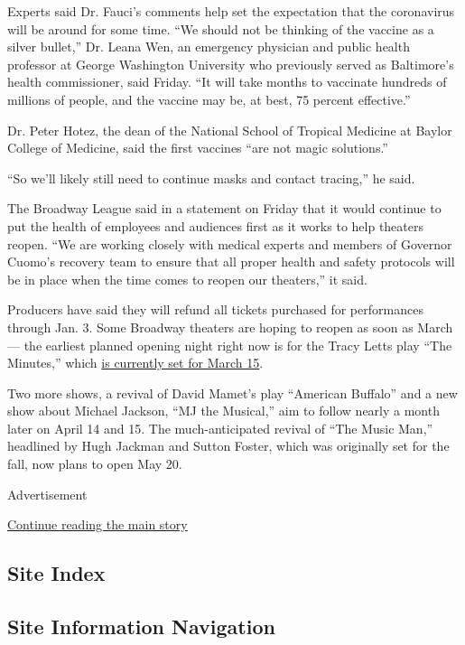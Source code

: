 Experts said Dr. Fauci's comments help set the expectation that the
coronavirus will be around for some time. ``We should not be thinking of
the vaccine as a silver bullet,'' Dr. Leana Wen, an emergency physician
and public health professor at George Washington University who
previously served as Baltimore's health commissioner, said Friday. ``It
will take months to vaccinate hundreds of millions of people, and the
vaccine may be, at best, 75 percent effective.''

Dr. Peter Hotez, the dean of the National School of Tropical Medicine at
Baylor College of Medicine, said the first vaccines ``are not magic
solutions.''

``So we'll likely still need to continue masks and contact tracing,'' he
said.

The Broadway League said in a statement on Friday that it would continue
to put the health of employees and audiences first as it works to help
theaters reopen. ``We are working closely with medical experts and
members of Governor Cuomo's recovery team to ensure that all proper
health and safety protocols will be in place when the time comes to
reopen our theaters,'' it said.

Producers have said they will refund all tickets purchased for
performances through Jan. 3. Some Broadway theaters are hoping to reopen
as soon as March --- the earliest planned opening night right now is for
the Tracy Letts play ``The Minutes,'' which
\href{https://www.nytimes3xbfgragh.onion/2020/06/29/theater/when-broadway-reopening-coronavirus.html}{is
currently set for March 15}.

Two more shows, a revival of David Mamet's play ``American Buffalo'' and
a new show about Michael Jackson, ``MJ the Musical,'' aim to follow
nearly a month later on April 14 and 15. The much-anticipated revival of
``The Music Man,'' headlined by Hugh Jackman and Sutton Foster, which
was originally set for the fall, now plans to open May 20.

Advertisement

\protect\hyperlink{after-bottom}{Continue reading the main story}

\hypertarget{site-index}{%
\subsection{Site Index}\label{site-index}}

\hypertarget{site-information-navigation}{%
\subsection{Site Information
Navigation}\label{site-information-navigation}}

